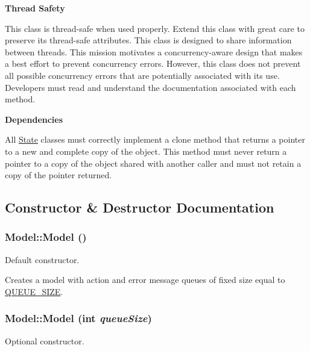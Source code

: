 {\bf Thread Safety} 

This class is thread-safe when used properly. Extend this class with great care to preserve its thread-safe attributes. This class is designed to share information between threads. This mission motivates a concurrency-aware design that makes a best effort to prevent concurrency errors. However, this class does not prevent all possible concurrency errors that are potentially associated with its use. Developers must read and understand the documentation associated with each method. 

{\bf Dependencies} 

All \hyperlink{classState}{State} classes must correctly implement a clone method that returns a pointer to a new and complete copy of the object. This method must never return a pointer to a copy of the object shared with another caller and must not retain a copy of the pointer returned.  

\subsection{Constructor \& Destructor Documentation}
\hypertarget{classModel_e3b375de5f6df4faf74a95d64748e048}{
\subsubsection[{Model}]{\setlength{\rightskip}{0pt plus 5cm}Model::Model ()}}
\label{classModel_e3b375de5f6df4faf74a95d64748e048}


Default constructor. 

Creates a model with action and error message queues of fixed size equal to \hyperlink{model_8h_142810068f1b99cd93d3fc9f0e160e02}{QUEUE\_\-SIZE}. \hypertarget{classModel_0dfa7627123dd65d7593b72cf03901f9}{
\subsubsection[{Model}]{\setlength{\rightskip}{0pt plus 5cm}Model::Model (int {\em queueSize})}}
\label{classModel_0dfa7627123dd65d7593b72cf03901f9}


Optional constructor. 

